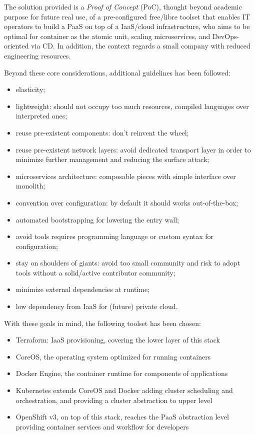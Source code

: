 The solution provided is a \textit{Proof of Concept} (PoC), thought beyond academic purpose for future real use, of a pre-configured free/libre toolset that enables IT operators to build a PaaS on top of a IaaS/cloud infrastructure, who aims to be optimal for container as the atomic unit, scaling microservices, and DevOps-oriented via CD.  In addition, the context regards a small company with reduced engineering resources.

Beyond these core considerations, additional guidelines has been followed:

\begin{itemize}
\item elasticity;
\item lightweight: should not occupy too much resources, compiled languages over interpreted ones;
\item reuse pre-existent components: don't reinvent the wheel;
\item reuse pre-existent network layers: avoid dedicated transport layer in order to minimize further management and reducing the surface attack;
\item microservices architecture: composable pieces with simple interface over monolith;
\item convention over configuration: by default it should works out-of-the-box;
\item automated bootstrapping for lowering the entry wall;
\item avoid tools requires programming language or custom syntax for configuration;
\item stay on shoulders of giants: avoid too small community and risk to adopt tools without a solid/active contributor community;
\item minimize external dependencies at runtime;
\item low dependency from IaaS for (future) private cloud.
\end{itemize}

With these goals in mind, the following toolset has been chosen:

\begin{itemize}
\item Terraform: IaaS provisioning, covering the lower layer of this stack
\item CoreOS, the operating system optimized for running  containers
\item Docker Engine, the container runtime for components of applications
\item Kubernetes extends CoreOS and Docker adding cluster scheduling and orchestration, and providing a cluster abstraction to upper level
\item OpenShift v3, on top of this stack, reaches the PaaS abstraction level providing container services and workflow for developers
\end{itemize}

